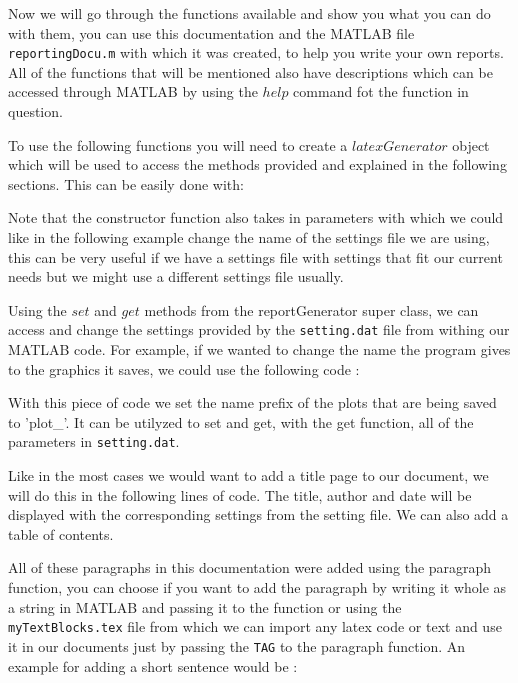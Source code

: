 
Now we will go through the functions available and show you what you can do with them, you can
use this documentation and the MATLAB file {\tt reportingDocu.m} with which it was created, to 
help you write your own reports. All of the functions that will be mentioned also have 
descriptions which can be accessed through MATLAB by using the $help$ command fot the function
in question.


To use the following functions you will need to create a $latexGenerator$ object which will be used
to access the methods provided and explained in the following sections. This can be easily done with:


Note that the constructor function also takes in parameters with which we could like in the following example 
change the name of the settings file we are using, this can be very useful if we have a settings file with 
settings that fit our current needs but we might use a different settings file usually.



Using the $set$ and $get$ methods from the reportGenerator super class, we can access and change the
settings provided by the {\tt setting.dat} file from withing our MATLAB code. For example, if we wanted 
to change the name the program gives to the graphics it saves, we could use the following code : 


With this piece of code we set the name prefix of the plots that are being saved to 'plot\_'. 
It can be utilyzed to set and get, with the get function, all of the parameters in {\tt setting.dat}.


Like in the most cases we would want to add a title page to our document, we will do this in the following
lines of code. The title, author and date will be displayed with the corresponding settings from the 
setting file. We can also add a table of contents.


All of these paragraphs in this documentation were added using the paragraph function, you can choose if you
want to add the paragraph by writing it whole as a string in MATLAB and passing it to the function or using
the {\tt myTextBlocks.tex} file from which we can import any latex code or text and use it in our documents 
just by passing the {\tt TAG} to the paragraph function. 
An example for adding a short sentence would be : 

